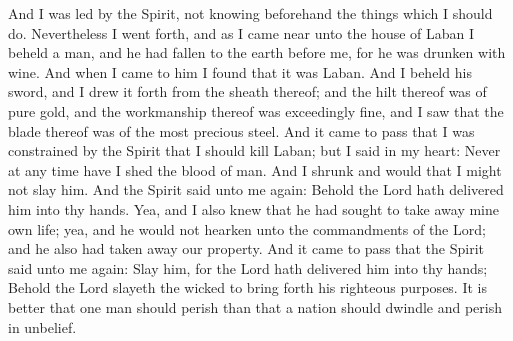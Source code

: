 And I was led by the Spirit, not knowing beforehand the things which I should do.
\bverse \iffalse Nevertheless I went forth, and as I came near unto the house of Laban I beheld a man, and he had fallen to the earth before me, for he was drunken with wine. \fi
Nevertheless I went forth, and as I came near unto the house of Laban I beheld a man, and he had fallen to the earth before me, for he was drunken with wine.
\bverse \iffalse And when I came to him I found that it was Laban. \fi
And when I came to him I found that it was Laban.
\bverse \iffalse And I beheld his sword, and I drew it forth from the sheath thereof; and the hilt thereof was of pure gold, and the workmanship thereof was exceedingly fine, and I saw that the blade thereof was of the most precious steel. \fi
And I beheld his sword, and I drew it forth from the sheath thereof; and the hilt thereof was of pure gold, and the workmanship thereof was exceedingly fine, and I saw that the blade thereof was of the most precious steel.
\bverse \iffalse And it came to pass that I was constrained by the Spirit that I should kill Laban; but I said in my heart: Never at any time have I shed the blood of man. And I shrunk and would that I might not slay him. \fi
And it came to pass that I was constrained by the Spirit that I should kill Laban; but I said in my heart: Never at any time have I shed the blood of man. And I shrunk and would that I might not slay him.
\bverse \iffalse And the Spirit said unto me again: Behold the Lord hath delivered him into thy hands. Yea, and I also knew that he had sought to take away mine own life; yea, and he would not hearken unto the commandments of the Lord; and he also had taken away our property. \fi
And the Spirit said unto me again: Behold the Lord hath delivered him into thy hands. Yea, and I also knew that he had sought to take away mine own life; yea, and he would not hearken unto the commandments of the Lord; and he also had taken away our property.
\bverse \iffalse And it came to pass that the Spirit said unto me again: Slay him, for the Lord hath delivered him into thy hands; \fi
And it came to pass that the Spirit said unto me again: Slay him, for the Lord hath delivered him into thy hands;
\bverse \iffalse Behold the Lord slayeth the wicked to bring forth his righteous purposes. It is better that one man should perish than that a nation should dwindle and perish in unbelief. \fi
Behold the Lord slayeth the wicked to bring forth his righteous purposes. It is better that one man should perish than that a nation should dwindle and perish in unbelief.
